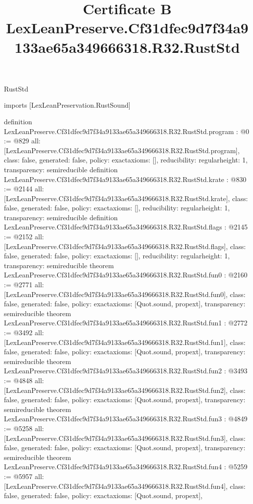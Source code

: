 \begin{lexlean}{RustStd}
\title{Certificate B LexLeanPreserve.Cf31dfec9d7f34a9133ae65a349666318.R32.RustStd}
\begin{coremodule}
imports [LexLeanPreservation.RustSound]

definition LexLeanPreserve.Cf31dfec9d7f34a9133ae65a349666318.R32.RustStd.program : @0 := @829 {
  all: [LexLeanPreserve.Cf31dfec9d7f34a9133ae65a349666318.R32.RustStd.program],
  class: false,
  generated: false,
  policy: exact{axioms: []},
  reducibility: regular{height: 1},
  transparency: semireducible
}
definition LexLeanPreserve.Cf31dfec9d7f34a9133ae65a349666318.R32.RustStd.krate : @830 := @2144 {
  all: [LexLeanPreserve.Cf31dfec9d7f34a9133ae65a349666318.R32.RustStd.krate],
  class: false,
  generated: false,
  policy: exact{axioms: []},
  reducibility: regular{height: 1},
  transparency: semireducible
}
definition LexLeanPreserve.Cf31dfec9d7f34a9133ae65a349666318.R32.RustStd.flags : @2145 := @2152 {
  all: [LexLeanPreserve.Cf31dfec9d7f34a9133ae65a349666318.R32.RustStd.flags],
  class: false,
  generated: false,
  policy: exact{axioms: []},
  reducibility: regular{height: 1},
  transparency: semireducible
}
theorem LexLeanPreserve.Cf31dfec9d7f34a9133ae65a349666318.R32.RustStd.fun0 : @2160 := @2771 {
  all: [LexLeanPreserve.Cf31dfec9d7f34a9133ae65a349666318.R32.RustStd.fun0],
  class: false,
  generated: false,
  policy: exact{axioms: [Quot.sound, propext]},
  transparency: semireducible
}
theorem LexLeanPreserve.Cf31dfec9d7f34a9133ae65a349666318.R32.RustStd.fun1 : @2772 := @3492 {
  all: [LexLeanPreserve.Cf31dfec9d7f34a9133ae65a349666318.R32.RustStd.fun1],
  class: false,
  generated: false,
  policy: exact{axioms: [Quot.sound, propext]},
  transparency: semireducible
}
theorem LexLeanPreserve.Cf31dfec9d7f34a9133ae65a349666318.R32.RustStd.fun2 : @3493 := @4848 {
  all: [LexLeanPreserve.Cf31dfec9d7f34a9133ae65a349666318.R32.RustStd.fun2],
  class: false,
  generated: false,
  policy: exact{axioms: [Quot.sound, propext]},
  transparency: semireducible
}
theorem LexLeanPreserve.Cf31dfec9d7f34a9133ae65a349666318.R32.RustStd.fun3 : @4849 := @5258 {
  all: [LexLeanPreserve.Cf31dfec9d7f34a9133ae65a349666318.R32.RustStd.fun3],
  class: false,
  generated: false,
  policy: exact{axioms: [Quot.sound, propext]},
  transparency: semireducible
}
theorem LexLeanPreserve.Cf31dfec9d7f34a9133ae65a349666318.R32.RustStd.fun4 : @5259 := @5957 {
  all: [LexLeanPreserve.Cf31dfec9d7f34a9133ae65a349666318.R32.RustStd.fun4],
  class: false,
  generated: false,
  policy: exact{axioms: [Quot.sound, propext]},
}
\end{coremodule}
\end{lexlean}
